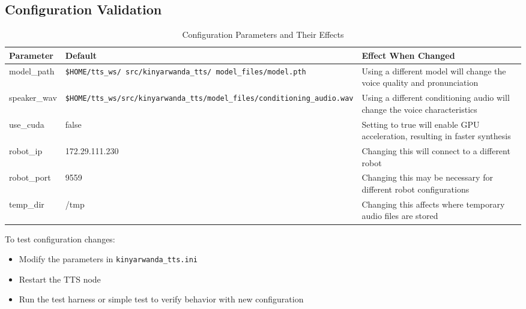 \documentclass{CSSRforAfrica}
\begin{document}
\subsection{Configuration Validation}
\begin{table}[h]
\centering
\begin{tabular}{|p{3cm}|p{6cm}|p{6cm}|}
\hline
\textbf{Parameter} & \textbf{Default} & \textbf{Effect When Changed} \\
\hline
model\_path & \texttt{\$HOME/tts\_ws/ \newline src/kinyarwanda\_tts/ \newline
model\_files/model.pth}
 & Using a different model will change the voice quality and pronunciation \\
\hline
speaker\_wav & \texttt{\$HOME/tts\_ws/\newline src/kinyarwanda\_tts/\newline  model\_files/\newline conditioning\_audio.wav} & Using a different conditioning audio will change the voice characteristics \\
\hline
use\_cuda & false & Setting to true will enable GPU acceleration, resulting in faster synthesis \\
\hline
robot\_ip & 172.29.111.230 & Changing this will connect to a different robot \\
\hline
robot\_port & 9559 & Changing this may be necessary for different robot configurations \\
\hline
temp\_dir & /tmp & Changing this affects where temporary audio files are stored \\
\hline
\end{tabular}
\caption{Configuration Parameters and Their Effects}
\label{table:config-params}
\end{table}

To test configuration changes:
\begin{itemize}
    \item Modify the parameters in \texttt{kinyarwanda\_tts.ini}
    \item Restart the TTS node
    \item Run the test harness or simple test to verify behavior with new configuration
\end{itemize}

\newpage
\end{document}
